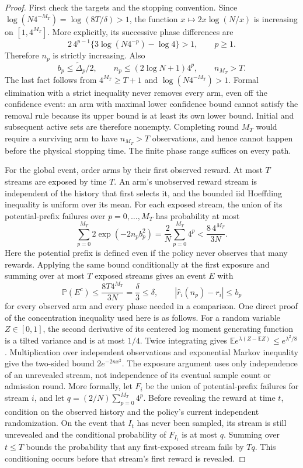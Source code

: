 \begin{proof}
First check the targets and the stopping convention. Since
$\log(N4^{-M_T})=\log(8T/\delta)>1$, the function
$x\mapsto2x\log(N/x)$ is increasing on $[1,4^{M_T}]$.
More explicitly, its successive phase differences are
\[
 2\,4^{p-1}\{3\log(N4^{-p})-\log4\}>1,\qquad p\ge1.
\]
Therefore $n_p$ is strictly increasing. Also
\begin{equation}
 b_p\le\widetilde\Delta_p/2,\qquad
 n_p\le(2\log N+1)4^p,\qquad n_{M_T}>T.
 \label{eq:ucbaa_target_facts}
\end{equation}
The last fact follows from $4^{M_T}\ge T+1$ and
$\log(N4^{-M_T})>1$. Formal elimination with a strict inequality never
removes every arm, even off the confidence event: an arm with maximal lower
confidence bound cannot satisfy the removal rule because its upper bound
is at least its own lower bound. Initial and subsequent active sets are
therefore nonempty. Completing round $M_T$ would require a surviving arm
to have $n_{M_T}>T$ observations, and hence cannot happen before the
physical stopping time. The finite phase range suffices on every path.

For the global event, order arms by their first observed reward. At most
$T$ streams are exposed by time $T$. An arm's unobserved reward stream is
independent of the history that first selects it, and the bounded iid
Hoeffding inequality is uniform over its mean. For each exposed stream,
the union of its potential-prefix failures over $p=0,\ldots,M_T$ has
probability at most
\[
 \sum_{p=0}^{M_T}2\exp(-2n_pb_p^2)
  =\frac2N\sum_{p=0}^{M_T}4^p
  <\frac{8\,4^{M_T}}{3N}.
\]
Here the potential prefix is defined even if the policy never observes
that many rewards. Applying the same bound conditionally at the first
exposure and summing over at most $T$ exposed streams gives an event $E$
with
\begin{equation}
 \mathbb P(E^c)\le\frac{8T4^{M_T}}{3N}=\frac\delta3\le\delta,
 \qquad
 |\hat r_i(n_p)-r_i|\le b_p
 \label{eq:ucbaa_global_coverage}
\end{equation}
for every observed arm and every phase needed in a comparison.
One direct proof of the concentration inequality used here is as follows.
For a random variable $Z\in[0,1]$, the second derivative of its centered
log moment generating function is a tilted variance and is at most $1/4$.
Twice integrating gives
$\mathbb E e^{\lambda(Z-\mathbb EZ)}\le e^{\lambda^2/8}$.
Multiplication over independent observations and exponential Markov
inequality give the two-sided bound $2e^{-2nx^2}$.
The exposure argument uses only independence of an unrevealed stream,
not independence of its eventual sample count or admission round.
More formally, let $F_i$ be the union of potential-prefix failures for
stream $i$, and let $q=(2/N)\sum_{p=0}^{M_T}4^p$. Before revealing the
reward at time $t$, condition on the observed history and the policy's
current independent randomization. On the event that $I_t$ has never
been sampled, its stream is still unrevealed and the conditional
probability of $F_{I_t}$ is at most $q$. Summing over $t\le T$ bounds
the probability that any first-exposed stream fails by $Tq$.
This conditioning occurs before that stream's first reward is revealed.


\end{proof}
